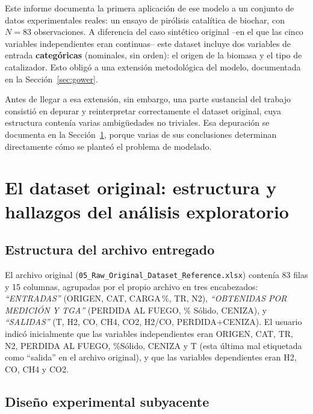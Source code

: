 \documentclass[11pt,a4paper]{article}
\begin{document}
Este informe documenta la primera aplicaci\'on de ese modelo a un conjunto de
datos experimentales reales: un ensayo de pir\'olisis catal\'itica de
biochar, con $N=83$ observaciones. A diferencia del caso sint\'etico
original --en el que las cinco variables independientes eran continuas--
este dataset incluye dos variables de entrada \textbf{categ\'oricas}
(nominales, sin orden): el origen de la biomasa y el tipo de catalizador.
Esto oblig\'o a una extensi\'on metodol\'ogica del modelo, documentada en la
Secci\'on~\ref{sec:gower}.

Antes de llegar a esa extensi\'on, sin embargo, una parte sustancial del
trabajo consisti\'o en depurar y reinterpretar correctamente el dataset
original, cuya estructura conten\'ia varias ambig\"uedades no triviales.
Esa depuraci\'on se documenta en la Secci\'on~\ref{sec:dataset}, porque
varias de sus conclusiones determinan directamente c\'omo se plante\'o el
problema de modelado.

\section{El dataset original: estructura y hallazgos del an\'alisis exploratorio}
\label{sec:dataset}

\subsection{Estructura del archivo entregado}

El archivo original (\texttt{05\_Raw\_Original\_Dataset\_Reference.xlsx})
conten\'ia 83 filas y 15 columnas, agrupadas por el propio archivo en tres
encabezados: \emph{``ENTRADAS''} (ORIGEN, CAT, CARGA\,\%, TR, N2),
\emph{``OBTENIDAS POR MEDICI\'ON Y TGA''} (PERDIDA AL FUEGO, \% S\'olido,
CENIZA), y \emph{``SALIDAS''} (T, H2, CO, CH4, CO2, H2/CO, PERDIDA+CENIZA).
El usuario indic\'o inicialmente que las variables independientes eran
ORIGEN, CAT, TR, N2, PERDIDA AL FUEGO, \%S\'olido, CENIZA y T (esta \'ultima
mal etiquetada como ``salida'' en el archivo original), y que las variables
dependientes eran H2, CO, CH4 y CO2.

\subsection{Dise\~no experimental subyacente}
\end{document}
